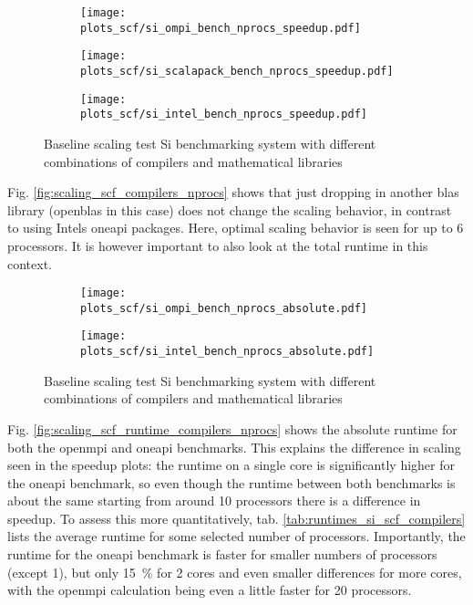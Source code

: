 \documentclass[main.tex]{subfiles}
\begin{document}
\begin{figure}[ht!]
\begin{subfigure}[b]{0.49\textwidth}
    \centering
    \texttt{[image: plots\_scf/si\_ompi\_bench\_nprocs\_speedup.pdf]}
\end{subfigure}
\begin{subfigure}[b]{0.49\textwidth}
    \centering
    \texttt{[image: plots\_scf/si\_scalapack\_bench\_nprocs\_speedup.pdf]}
\end{subfigure}
\begin{subfigure}[b]{0.49\textwidth}
    \centering
    \texttt{[image: plots\_scf/si\_intel\_bench\_nprocs\_speedup.pdf]}
\end{subfigure}
\caption{Baseline scaling test Si benchmarking system with different combinations of compilers and mathematical libraries}
\label{fig:scaling_scf_compilers_si}
\end{figure}

Fig. \ref{fig:scaling_scf_compilers_nprocs} shows that just dropping in another \gls{blas} library (\gls{openblas} in this case) does not change the scaling behavior, in contrast to using Intels \gls{oneapi} packages.
Here, optimal scaling behavior is seen for up to 6 processors.
It is however important to also look at the total runtime in this context.

\begin{figure}[ht!]
\begin{subfigure}[b]{0.49\textwidth}
    \centering
    \texttt{[image: plots\_scf/si\_ompi\_bench\_nprocs\_absolute.pdf]}
\end{subfigure}
\begin{subfigure}[b]{0.49\textwidth}
    \centering
    \texttt{[image: plots\_scf/si\_intel\_bench\_nprocs\_absolute.pdf]}
\end{subfigure}
\caption{Baseline scaling test Si benchmarking system with different combinations of compilers and mathematical libraries}
\label{fig:scaling_scf_compilers_runtime_si}
\end{figure}
Fig. \ref{fig:scaling_scf_runtime_compilers_nprocs} shows the absolute runtime for both the \gls{openmpi} and \gls{oneapi} benchmarks.
This explains the difference in scaling seen in the speedup plots: the runtime on a single core is significantly higher for the \gls{oneapi} benchmark, so even though the runtime between both benchmarks is about the same starting from around 10 processors there is a difference in speedup.
To assess this more quantitatively, tab. \ref{tab:runtimes_si_scf_compilers} lists the average runtime for some selected number of processors.
Importantly, the runtime for the \gls{oneapi} benchmark is faster for smaller numbers of processors (except 1), but only \SI{15}{\percent} for 2 cores and even smaller differences for more cores, with the \gls{openmpi} calculation being even a little faster for 20 processors.
\end{document}
